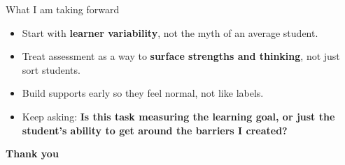 \documentclass[aspectratio=169,11pt]{beamer}
\begin{document}
\begin{frame}{What I am taking forward}
\begin{itemize}
  \item Start with \textbf{learner variability}, not the myth of an average student.
  \item Treat assessment as a way to \textbf{surface strengths and thinking}, not just sort students.
  \item Build supports early so they feel normal, not like labels.
  \item Keep asking: \textbf{Is this task measuring the learning goal, or just the student's ability to get around the barriers I created?}
\end{itemize}

\vfill
\centering
\textbf{Thank you}
\end{frame}
\end{document}
